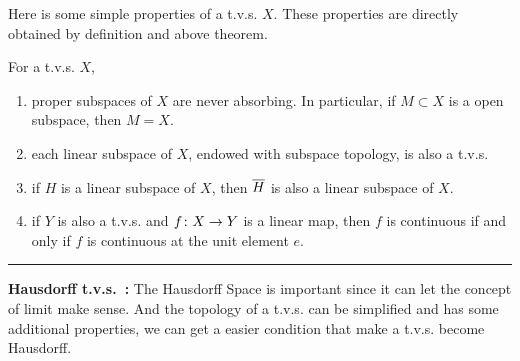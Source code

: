 \documentclass[a4paper,11pt]{report}
\begin{document}
Here is some simple properties of a t.v.s. $X$. These properties are directly obtained by definition and above theorem.
\begin{prop}
	For a t.v.s. $X$,
	\begin{enumerate}[label=\arabic*)]
		\item proper subspaces of $X$ are never absorbing. In particular, if $M \subset X$ is a open subspace, then $M = X$.
		\item each linear subspace of $X$, endowed with subspace topology, is also a t.v.s.
		\item if $H$ is a linear subspace of $X$, then $\overline{H}$ is also a linear subspace of $X$.
		\item if $Y$ is also a t.v.s. and $f \colon X \rightarrow Y$ is a linear map, then $f$ is continuous if and only if $f$ is continuous at the unit element $e$.
	\end{enumerate}
\end{prop}

\vspace{0.2in}
\rule{1mm}{1mm} \textbf{Hausdorff t.v.s.~:} The Hausdorff Space is important since it can let the concept of limit make sense. And the topology of a t.v.s. can be simplified and has some additional properties, we can get a easier condition that make a t.v.s. become Hausdorff.
\end{document}
